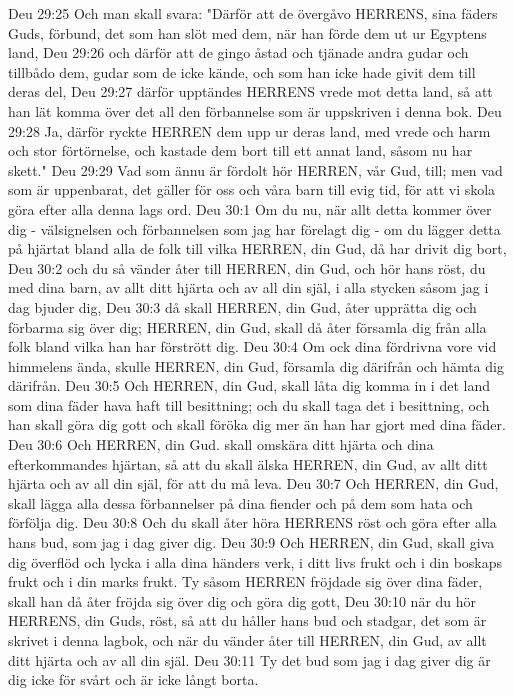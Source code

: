 Deu 29:25  Och man skall svara: "Därför att de övergåvo HERRENS, sina fäders Guds, förbund, det som han slöt med dem, när han förde dem ut ur Egyptens land,
Deu 29:26  och därför att de gingo åstad och tjänade andra gudar och tillbådo dem, gudar som de icke kände, och som han icke hade givit dem till deras del,
Deu 29:27  därför upptändes HERRENS vrede mot detta land, så att han lät komma över det all den förbannelse som är uppskriven i denna bok.
Deu 29:28  Ja, därför ryckte HERREN dem upp ur deras land, med vrede och harm och stor förtörnelse, och kastade dem bort till ett annat land, såsom nu har skett."
Deu 29:29  Vad som ännu är fördolt hör HERREN, vår Gud, till; men vad som är uppenbarat, det gäller för oss och våra barn till evig tid, för att vi skola göra efter alla denna lags ord.
Deu 30:1  Om du nu, när allt detta kommer över dig - välsignelsen och förbannelsen som jag har förelagt dig - om du lägger detta på hjärtat bland alla de folk till vilka HERREN, din Gud, då har drivit dig bort,
Deu 30:2  och du så vänder åter till HERREN, din Gud, och hör hans röst, du med dina barn, av allt ditt hjärta och av all din själ, i alla stycken såsom jag i dag bjuder dig,
Deu 30:3  då skall HERREN, din Gud, åter upprätta dig och förbarma sig över dig; HERREN, din Gud, skall då åter församla dig från alla folk bland vilka han har förstrött dig.
Deu 30:4  Om ock dina fördrivna vore vid himmelens ända, skulle HERREN, din Gud, församla dig därifrån och hämta dig därifrån.
Deu 30:5  Och HERREN, din Gud, skall låta dig komma in i det land som dina fäder hava haft till besittning; och du skall taga det i besittning, och han skall göra dig gott och skall föröka dig mer än han har gjort med dina fäder.
Deu 30:6  Och HERREN, din Gud. skall omskära ditt hjärta och dina efterkommandes hjärtan, så att du skall älska HERREN, din Gud, av allt ditt hjärta och av all din själ, för att du må leva.
Deu 30:7  Och HERREN, din Gud, skall lägga alla dessa förbannelser på dina fiender och på dem som hata och förfölja dig.
Deu 30:8  Och du skall åter höra HERRENS röst och göra efter alla hans bud, som jag i dag giver dig.
Deu 30:9  Och HERREN, din Gud, skall giva dig överflöd och lycka i alla dina händers verk, i ditt livs frukt och i din boskaps frukt och i din marks frukt. Ty såsom HERREN fröjdade sig över dina fäder, skall han då åter fröjda sig över dig och göra dig gott,
Deu 30:10  när du hör HERRENS, din Guds, röst, så att du håller hans bud och stadgar, det som är skrivet i denna lagbok, och när du vänder åter till HERREN, din Gud, av allt ditt hjärta och av all din själ.
Deu 30:11  Ty det bud som jag i dag giver dig är dig icke för svårt och är icke långt borta.
